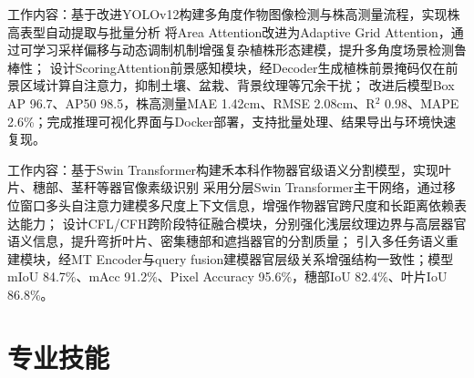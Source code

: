 \documentclass{resume}
\begin{document}
{工作内容：基于改进YOLOv12构建多角度作物图像检测与株高测量流程，实现株高表型自动提取与批量分析}
\Content
{ 将Area Attention改进为Adaptive Grid Attention，通过可学习采样偏移与动态调制机制增强复杂植株形态建模，提升多角度场景检测鲁棒性；}
{ 设计ScoringAttention前景感知模块，经Decoder生成植株前景掩码仅在前景区域计算自注意力，抑制土壤、盆栽、背景纹理等冗余干扰；}
{ 改进后模型Box AP 96.7、AP50 98.5，株高测量MAE 1.42cm、RMSE 2.08cm、R$^2$ 0.98、MAPE 2.6\%；完成推理可视化界面与Docker部署，支持批量处理、结果导出与环境快速复现。}

{工作内容：基于Swin Transformer构建禾本科作物器官级语义分割模型，实现叶片、穗部、茎秆等器官像素级识别}
\Content
{ 采用分层Swin Transformer主干网络，通过移位窗口多头自注意力建模多尺度上下文信息，增强作物器官跨尺度和长距离依赖表达能力；}
{ 设计CFL/CFH跨阶段特征融合模块，分别强化浅层纹理边界与高层器官语义信息，提升弯折叶片、密集穗部和遮挡器官的分割质量；}
{ 引入多任务语义重建模块，经MT Encoder与query fusion建模器官层级关系增强结构一致性；模型mIoU 84.7\%、mAcc 91.2\%、Pixel Accuracy 95.6\%，穗部IoU 82.4\%、叶片IoU 86.8\%。}


\section{专业技能}
\end{document}
